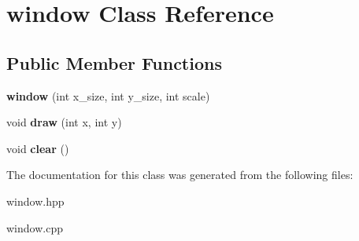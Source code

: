 \hypertarget{classwindow}{}\section{window Class Reference}
\label{classwindow}
\subsection*{Public Member Functions}
\begin{DoxyCompactItemize}
\item 
\mbox{\label{classwindow_a26b54741901955b42941d3e08f09ba83}} 
{\bfseries window} (int x\+\_\+size, int y\+\_\+size, int scale)
\item 
\mbox{\label{classwindow_a20541f9e1801404baf9a9184365e9b93}} 
void {\bfseries draw} (int x, int y)
\item 
\mbox{\label{classwindow_a6c050475db28a9b773cf2edbc56ece86}} 
void {\bfseries clear} ()
\end{DoxyCompactItemize}


The documentation for this class was generated from the following files\+:\begin{DoxyCompactItemize}
\item 
window.\+hpp\item 
window.\+cpp\end{DoxyCompactItemize}
